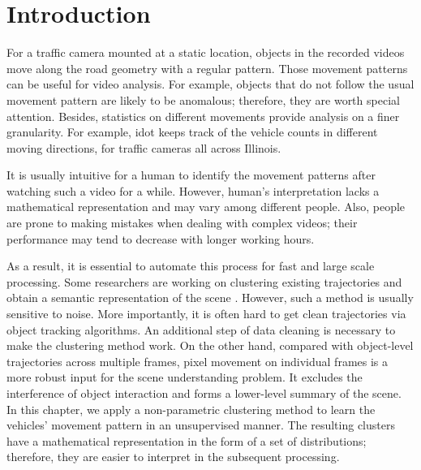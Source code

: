 \section{Introduction}
\label{sec:scene-intro}

For a traffic camera mounted at a static location, objects in the recorded videos move along the road geometry with a regular pattern.
Those movement patterns can be useful for video analysis.
For example, objects that do not follow the usual movement pattern are likely to be anomalous; therefore, they are worth special attention.
Besides, statistics on different movements provide analysis on a finer granularity. 
For example, \gls{idot} keeps track of the vehicle counts in different moving directions, for traffic cameras all across Illinois.

It is usually intuitive for a human to identify the movement patterns after watching such a video for a while.
However, human's interpretation lacks a mathematical representation and may vary among different people.
Also, people are prone to making mistakes when dealing with complex videos; their performance may tend to decrease with longer working hours.

As a result, it is essential to automate this process for fast and large scale processing. 
Some researchers are working on clustering existing trajectories and obtain a semantic representation of the scene \cite{tung2011goal,xu2015unsupervised}.
However, such a method is usually sensitive to noise. 
More importantly, it is often hard to get clean trajectories via object tracking algorithms.
An additional step of data cleaning is necessary to make the clustering method work.
On the other hand, compared with object-level trajectories across multiple frames, pixel movement on individual frames is a more robust input for the scene understanding problem.
It excludes the interference of object interaction and forms a lower-level summary of the scene.
In this chapter, we apply a non-parametric clustering method \cite{wang2009unsupervised} to learn the vehicles' movement pattern in an unsupervised manner.
The resulting clusters have a mathematical representation in the form of a set of distributions; therefore, they are easier to interpret in the subsequent processing.
